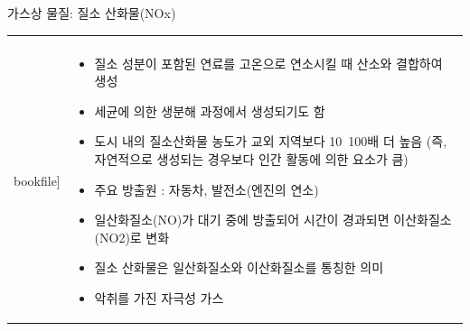 \begin{frame}[t]{가스상 물질: 질소 산화물(NOx)}
	\begin{tabular}{ll}
		\begin{minipage}[t]{0.3\textwidth}\scriptsize
			\begin{figure}[t]
				\texttt{[image: \\bookfile]}
			\end{figure}
		\end{minipage}	
		&
		\begin{minipage}[t]{0.65\textwidth} \scriptsize	
			\begin{itemize}
				\item 질소 성분이 포함된 연료를 고온으로 연소시킬 때 산소와 결합하여 생성
				\item 세균에 의한 생분해 과정에서 생성되기도 함
				\item 도시 내의 질소산화물 농도가 교외 지역보다 10~100배 더 높음 (즉, 자연적으로 생성되는 경우보다 인간 활동에 의한 요소가 큼)
				\item 주요 방출원 : 자동차, 발전소(엔진의 연소)
				\item 일산화질소(NO)가 대기 중에 방출되어 시간이 경과되면 이산화질소(NO2)로 변화
				\item 질소 산화물은 일산화질소와 이산화질소를 통칭한 의미
				\item 악취를 가진 자극성 가스
					
			\end{itemize}

		\end{minipage}
	\end{tabular}
\end{frame}




